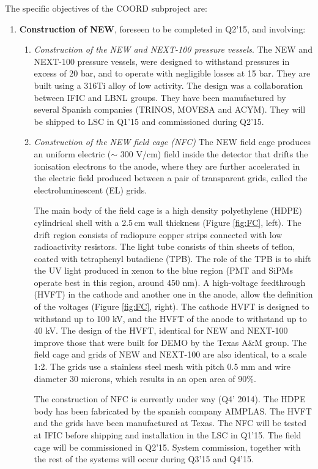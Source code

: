 The specific objectives of the COORD subproject are:

\begin{enumerate}
\item {\bf Construction of NEW}, foreseen to be completed in Q2'15, and involving:
\begin{enumerate}
\item {\em Construction of the NEW and NEXT-100 pressure vessels}.
The NEW and NEXT-100 pressure vessels, were designed to withstand pressures in excess of 20 bar, and to operate with negligible losses at 15 bar. They are built using a 316Ti alloy of low activity. 
The design was a collaboration between IFIC and LBNL groups. They have been manufactured by several Spanish companies (TRINOS, MOVESA and ACYM). They will be shipped to LSC in Q1'15 and commissioned during Q2'15. 

\item {\em Construction of the NEW field cage (NFC)}
The NEW field cage produces an uniform electric ($\sim$ 300 V/cm) field inside the  detector that drifts the ionisation electrons to the anode, where they are further accelerated in the electric field produced between a pair of transparent grids, called the electroluminescent (EL) grids. 

The main body of the field cage is a high density polyethylene (HDPE) cylindrical shell with a 2.5\,cm wall thickness (Figure \ref{fig:FC}, left).  The drift region consists of radiopure  copper strips connected with low radioactivity resistors.  The light tube consists of thin sheets of teflon, coated with tetraphenyl butadiene (TPB). The role of the TPB is to shift the UV light produced in xenon to the blue region (PMT and SiPMs operate best in this region, around 450 nm).  A high-voltage feedthrough (HVFT) in the cathode and another one in the anode, allow the definition of the voltages (Figure \ref{fig:FC}, right). The cathode HVFT is designed to withstand up to 100 kV, and the HVFT of the anode to withstand up to 40 kV. The design of the HVFT, identical for NEW and NEXT-100 improve those that were built for DEMO by the Texas A\&M group. The field cage and grids of NEW and NEXT-100 are also identical, to a scale 1:2. The grids use a stainless steel mesh with pitch 0.5 mm and wire diameter 30 microns, which results in an open area of 90\%. 

The construction of NFC is currently under way (Q4' 2014). The HDPE body has been fabricated by the spanish company AIMPLAS. The HVFT and the grids have been manufactured at Texas. The  NFC will be tested at IFIC before shipping and installation in the LSC in Q1'15. The field cage will be commissioned in Q2'15. System commission, together with the rest of the systems will occur during Q3'15 and Q4'15.


\end{enumerate}
\end{enumerate}
